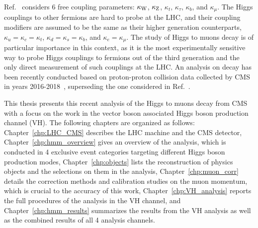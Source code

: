 Ref.~\cite{Sirunyan:2640611} considers 6 free coupling parameters: $\kappa_{\mathrm{W}}$, $\kappa_{\mathrm{Z}}$, $\kappa_{t}$, $\kappa_{\tau}$, $\kappa_{b}$, and $\kappa_{\mu}$.
The Higgs couplings to other fermions are hard to probe at the LHC, 
and their coupling modifiers are assumed to be the same as their higher generation counterparts, $\kappa_{u} = \kappa_{c} = \kappa_{t}$,
$\kappa_{d} = \kappa_{s} = \kappa_{b}$, and $\kappa_{e} = \kappa_{\mu}$.
The study of Higgs to muons decay is of particular importance in this context,
as it is the most experimentally sensitive way to probe Higgs couplings to fermions out of the third generation
and the only direct measurement of such couplings at the LHC.
An analysis on \hmm decay has been recently conducted based on proton-proton collision data collected by CMS in years 2016-2018~\cite{Sirunyan_2021},
superseding the one considered in Ref.~\cite{Sirunyan:2640611}. 



This thesis presents this recent analysis of the Higgs to muons decay from CMS 
with a focus on the work in the vector boson associated Higgs boson production channel (VH).
The following chapters are organized as follows:
Chapter~\ref{chp:LHC_CMS} describes the LHC machine and the CMS detector,
Chapter~\ref{chp:hmm_overview} gives an overview of the \hmm analysis, 
which is conducted in 4 exclusive event categories targeting different Higgs boson production modes,
Chapter~\ref{chp:objects} lists the reconstruction of physics objects and the selections on them in the analysis,
Chapter~\ref{chp:muon_corr} details the correction methods and calibration studies on the muon momentum, which is crucial to the accuracy of this work,
Chapter~\ref{chp:VH_analysis} reports the full procedures of the analysis in the VH channel,
and Chapter~\ref{chp:hmm_results} summarizes the results from the VH analysis 
as well as the combined results of all 4 analysis channels. 